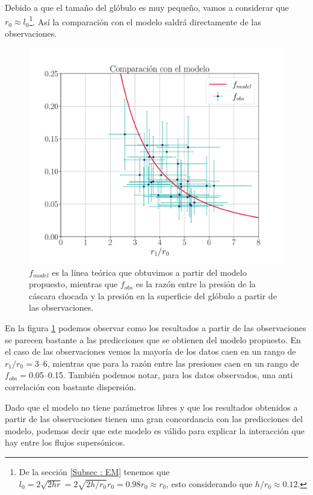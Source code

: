 \documentclass{book}
\begin{document}
Debido a que el tamaño del glóbulo es muy pequeño, vamos a considerar que $r_0\approx l_0$\footnote{De la sección \ref{Subsec : EM} tenemos que $l_0=2\sqrt{2hr}=2\sqrt{2h/r_0}r_0=0.98 r_0\approx r_0$, esto considerando que $h/r_0\approx0.12$.}. Así la comparación con el modelo saldrá directamente de las observaciones. 

\begin{figure}[htb]
    \centering
    \includegraphics[width=\textwidth]{ultimos/R_2(1).pdf}
    \caption{$f_{model}$ es la línea teórica que obtuvimos a partir del modelo propuesto, mientras que $f_{obs}$ es la razón entre la presión de la cáscara chocada  y la presión en la superficie del glóbulo a partir de las observaciones.}
    \label{Resultados_modelo}
\end{figure}

En la figura \ref{Resultados_modelo} podemos observar como los resultados a partir de las observaciones se parecen bastante a las predicciones que se obtienen del modelo propuesto. En el caso de las observaciones vemos la mayoría de los datos caen en un rango de $r_1/r_0=$3--6, mientras que para la razón entre las presiones caen en un rango de $f_{obs}=$0.05--0.15. También podemos notar, para los datos observados, una anti correlación con bastante dispersión.

Dado que el modelo no tiene parámetros libres y que los resultados obtenidos a partir de las observaciones tienen una gran concordancia con las predicciones del modelo, podemos decir que este modelo es válido para explicar la interacción que hay entre los flujos supersónicos.
\end{document}
